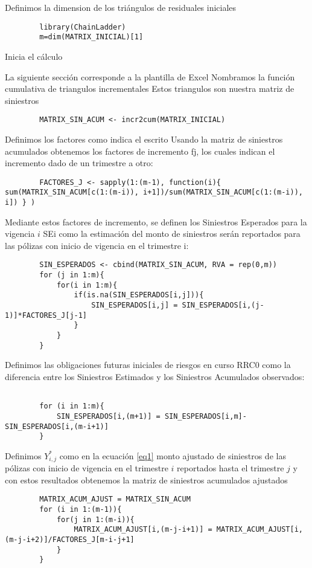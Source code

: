 \documentclass[11pt,twoside,openright,spanish]{report}
\numberwithin{equation}{chapter}
\numberwithin{figure}{chapter}
\numberwithin{table}{chapter}
\begin{document}
\vspace{0.3cm}
Definimos la dimension de los triángulos de residuales iniciales
\begin{lstlisting}			
		library(ChainLadder)
		m=dim(MATRIX_INICIAL)[1]
\end{lstlisting}
Inicia el cálculo

La siguiente sección corresponde a la plantilla de Excel
Nombramos la función cumulativa de triangulos incrementales
Estos triangulos son nuestra matriz de siniestros
\begin{lstlisting}			
		MATRIX_SIN_ACUM <- incr2cum(MATRIX_INICIAL)
\end{lstlisting}

\vspace{0.3cm}
Definimos los factores como indica el escrito
Usando la matriz de siniestros acumulados obtenemos los factores de incremento
fj, los cuales indican el incremento dado de un trimestre a otro:
\begin{lstlisting}			
		FACTORES_J <- sapply(1:(m-1), function(i){ sum(MATRIX_SIN_ACUM[c(1:(m-i)), i+1])/sum(MATRIX_SIN_ACUM[c(1:(m-i)), i]) } )
\end{lstlisting}

\vspace{0.3cm}
Mediante estos factores de incremento, se definen los Siniestros Esperados para la vigencia $i$ SEi como la estimación del monto de siniestros serán reportados para las pólizas con inicio de vigencia en el trimestre i:
\begin{lstlisting}			
		SIN_ESPERADOS <- cbind(MATRIX_SIN_ACUM, RVA = rep(0,m))
		for (j in 1:m){
			for(i in 1:m){
				if(is.na(SIN_ESPERADOS[i,j])){
					SIN_ESPERADOS[i,j] = SIN_ESPERADOS[i,(j-1)]*FACTORES_J[j-1]
				}
			}
		}
\end{lstlisting}

\vspace{0.3cm}
Definimos las obligaciones futuras iniciales de riesgos en curso RRC0 como la diferencia entre los Siniestros Estimados y los Siniestros Acumulados observados:
\begin{lstlisting}			

		for (i in 1:m){
			SIN_ESPERADOS[i,(m+1)] = SIN_ESPERADOS[i,m]-SIN_ESPERADOS[i,(m-i+1)]
		}
\end{lstlisting}

\vspace{0.3cm}
Definimos $Y_{i,j}^{*}$ como en la ecuación \eqref{eq1} monto ajustado de siniestros de las pólizas con inicio de vigencia en el trimestre $i$ reportados hasta el trimestre $j$ y con estos resultados obtenemos la matriz de siniestros acumulados ajustados
\begin{lstlisting}			
		MATRIX_ACUM_AJUST = MATRIX_SIN_ACUM
		for (i in 1:(m-1)){
			for(j in 1:(m-i)){
				MATRIX_ACUM_AJUST[i,(m-j-i+1)] = MATRIX_ACUM_AJUST[i,(m-j-i+2)]/FACTORES_J[m-i-j+1]
			}
		}
\end{lstlisting}
\end{document}
